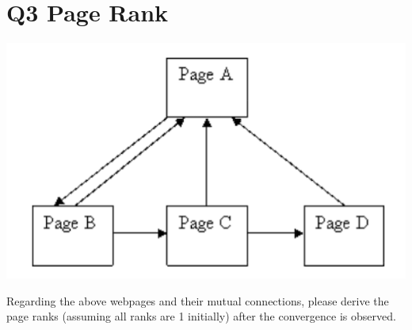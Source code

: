 \documentclass{article}
\begin{document}
\section*{Q3 Page Rank}
\begin{center}
    \includegraphics[scale=0.5]{q3.png}
\end{center}

Regarding the above webpages and their mutual connections, please derive the page ranks (assuming all ranks are 1 initially) after the convergence is observed.
\end{document}
